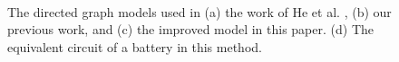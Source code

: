 \documentclass[a4paper]{article}
\begin{document}
\begin{figure}[htbp]
    \centering
    \\
    \caption{
        The directed graph models used in (a) the work of He et al. \cite{heExploringAdaptiveReconfiguration2013}, (b) our previous work, and (c) the improved model in this paper.
        (d) The equivalent circuit of a battery in this method.
    }
    \label{fig:model}
\end{figure}
\end{document}
